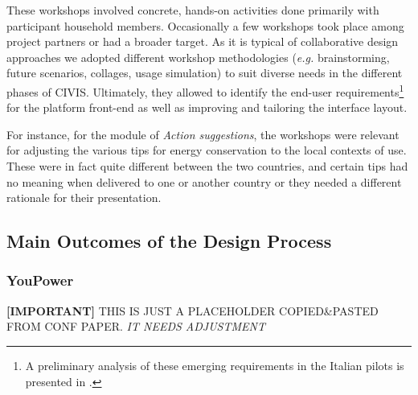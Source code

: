 These workshops involved concrete, hands-on activities done primarily with participant household members.
Occasionally a few workshops took place among project partners or had a broader target.
As it is typical of collaborative design approaches we adopted different workshop methodologies (\textit{e.g.} brainstorming, future scenarios,
collages, usage simulation) to suit diverse needs in the different phases of CIVIS.
Ultimately, they allowed to identify the end-user requirements\footnote{A preliminary analysis of these emerging requirements in the Italian pilots
is presented in \cite{capaccioli_participatory_2016}.} for the platform front-end as well as
improving and tailoring the interface layout.

For instance, for the module of \textit{Action suggestions}, the workshops were relevant for adjusting the various
tips for energy conservation to the local contexts of use. These were in fact quite different between the two countries,
 and certain tips had no meaning when delivered to one or another country or they needed a different
 rationale for their presentation.


\subsection{Main Outcomes of the Design Process} %

\subsubsection{YouPower} %
\begin{svgraybox}
\textbf{[IMPORTANT]} THIS IS JUST A PLACEHOLDER COPIED\&PASTED FROM CONF PAPER. \textit{IT NEEDS ADJUSTMENT}
\end{svgraybox}

